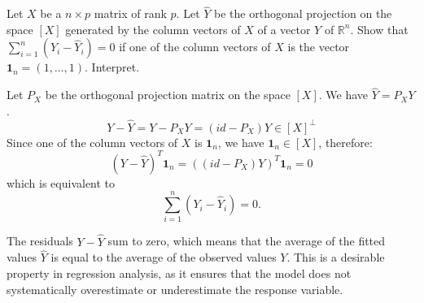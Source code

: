 \begin{exercise}
    Let \(X\) be a \(n \times p\) matrix of rank \(p\). Let \(\hat{Y}\) be the orthogonal projection on the space \([X]\) generated by the column vectors of \(X\) of a vector \(Y\) of \(\mathbb{R}^n\). Show that \(\sum_{i=1}^n (Y_i - \hat{Y}_i) = 0\) if one of the column vectors of \(X\) is the vector \(\mathbf{1}_n = (1, \ldots, 1)\). Interpret.
\end{exercise}

\begin{answerenum}
    \item Let \(P_X\) be the orthogonal projection matrix on the space \([X]\).
        We have \( \hat{Y} = P_X Y \).
        \[ Y - \hat{Y} = Y - P_X Y = (id - P_X)Y \in [X]^\perp \]
        Since one of the column vectors of \(X\) is \(\mathbf{1}_n\), we have \(\mathbf{1}_n \in [X]\), therefore:
        \[ (Y - \hat{Y})^T \mathbf{1}_n = ((id - P_X)Y)^T \mathbf{1}_n = 0 \]
        which is equivalent to
        \[ \sum_{i=1}^n (Y_i - \hat{Y}_i) = 0. \]
    \item The residuals \(Y - \hat{Y}\) sum to zero, which means that the average of the fitted values \(\hat{Y}\) is equal to the average of the observed values \(Y\). This is a desirable property in regression analysis, as it ensures that the model does not systematically overestimate or underestimate the response variable.
\end{answerenum}